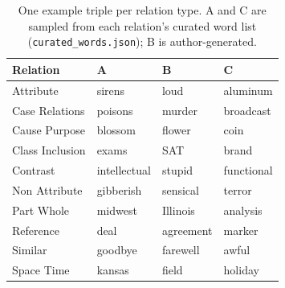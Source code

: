 \begin{table}[h]
\centering
\small
\renewcommand{\arraystretch}{1.08}
\begin{tabular}{llll}
\toprule
Relation & A & B & C \\
\midrule
Attribute & sirens & loud & aluminum \\
Case Relations & poisons & murder & broadcast \\
Cause Purpose & blossom & flower & coin \\
Class Inclusion & exams & SAT & brand \\
Contrast & intellectual & stupid & functional \\
Non Attribute & gibberish & sensical & terror \\
Part Whole & midwest & Illinois & analysis \\
Reference & deal & agreement & marker \\
Similar & goodbye & farewell & awful \\
Space Time & kansas & field & holiday \\
\bottomrule
\end{tabular}
\caption{One example triple per relation type. A and C are sampled from each relation's curated word list (\texttt{curated\_words.json}); B is author-generated.}
\label{tab:appendix_relation_examples}
\end{table}
